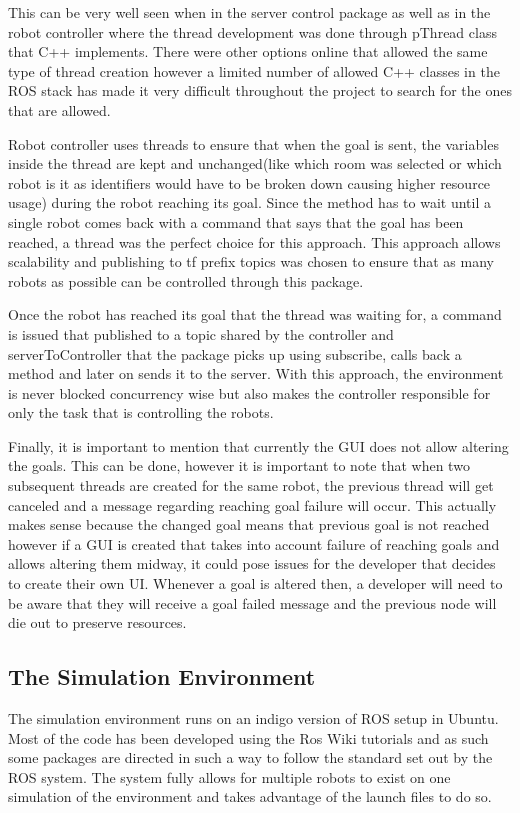 \documentclass{report}
\begin{document}
        This can be very well seen when in the server control package as well as in the robot controller where the thread development was done through pThread class that C++ implements. There were other options online that allowed the same type of thread creation however a limited number of allowed C++ classes in the ROS stack has made it very difficult throughout the project to search for the ones that are allowed.

        Robot controller uses threads to ensure that when the goal is sent, the variables inside the thread are kept and unchanged(like which room was selected or which robot is it as identifiers would have to be broken down causing higher resource usage) during the robot reaching its goal. Since the method has to wait until a single robot comes back with a command that says that the goal has been reached, a thread was the perfect choice for this approach. This approach allows scalability and publishing to tf prefix topics was chosen to ensure that as many robots as possible can be controlled through this package.

        Once the robot has reached its goal that the thread was waiting for, a command is issued that published to a topic shared by the controller and serverToController that the package picks up using subscribe, calls back a method and later on sends it to the server. With this approach, the environment is never blocked concurrency wise but also makes the controller responsible for only the task that is controlling the robots.

        Finally, it is important to mention that currently the GUI does not allow altering the goals. This can be done, however it is important to note that when two subsequent threads are created for the same robot, the previous thread will get canceled and a message regarding reaching goal failure will occur. This actually makes sense because the changed goal means that previous goal is not reached however if a GUI is created that takes into account failure of reaching goals and allows altering them midway, it could pose issues for the developer that decides to create their own UI. Whenever a goal is altered then, a developer will need to be aware that they will receive a goal failed message and the previous node will die out to preserve resources.

      \subsection{The Simulation Environment}
        The simulation environment runs on an indigo version of ROS setup in Ubuntu. Most of the code has been developed using the Ros Wiki tutorials and as such some packages are directed in such a way to follow the standard set out by the ROS system. The system fully allows for multiple robots to exist on one simulation of the environment and takes advantage of the launch files to do so.
\end{document}
